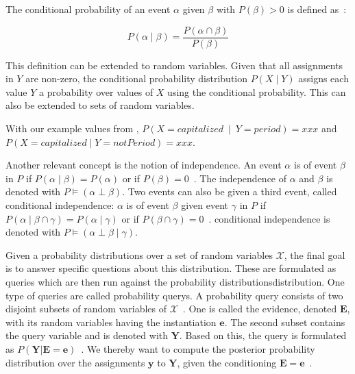 \bigskip

The \gls{conditional probability} of an event $\alpha$ given $\beta$ with $P(\beta)>0$ is defined as~\cite{koller2009probabilistic}:

\begin{equation}
P(\alpha\mid\beta) = \frac{P(\alpha\cap\beta)}{P(\beta)}
\label{equ:conditional-probability}
\end{equation}

This definition can be extended to \glspl{random variable}.
Given that all assignments in $Y$ are non-zero, the \gls{conditional probability distribution} $P(X\mid Y)$ assigns each value $Y$ a probability over values of $X$ using the \gls{conditional probability}.
This can also be extended to sets of \glspl{random variable}.

With our example values from , $P(X=capitalized\ \mid\ Y=period)=xxx$ and $P(X=capitalized\mid Y=notPeriod)=xxx$.

\bigskip

Another relevant concept is the notion of \gls{independence}.
An \gls{event} $\alpha$ is  of \gls{event} $\beta$ in $P$ if $P(\alpha\mid\beta)=P(\alpha)$ or if $P(\beta)=0$~\cite{koller2009probabilistic}.
The \gls{independence} of $\alpha$ and $\beta$ is denoted with $P\models(\alpha\perp\beta)$.
Two \glspl{event} can also be  given a third \gls{event}, called \gls{conditional independence}:
$\alpha$ is  of \gls{event} $\beta$ given \gls{event} $\gamma$ in $P$ if $P(\alpha\mid\beta\cap\gamma)=P(\alpha\mid\gamma)$ or if $P(\beta\cap\gamma)=0$~\cite{koller2009probabilistic}.
\Gls{conditional independence} is denoted with $P\models(\alpha\perp\beta\mid\gamma)$.


Given a \glspl{probability distribution} over a set of \glspl{random variable} $\mathcal{X}$, the final goal is to answer specific questions about this distribution.
These are formulated as queries which are then run against the \glspl{probability distribution}{distribution}.
One type of queries are called \glspl{probability query}.
A \gls{probability query} consists of two disjoint subsets of \glspl{random variable} of $\mathcal{X}$~\citep{koller2009probabilistic}.
One is called the \gls{evidence}, denoted $\bm{E}$, with its \glspl{random variable} having the instantiation $\bm{e}$.
The second subset contains the query variable and is denoted with $\bm{Y}$.
Based on this, the query is formulated as $P(\bm{Y}|\bm{E}=\bm{e})$~\citep{koller2009probabilistic}.
We thereby want to compute the posterior \gls{probability distribution} over the assignments $\bm{y}$ to $\bm{Y}$, given the conditioning $\bm{E}=\bm{e}$~\citep{koller2009probabilistic}.

